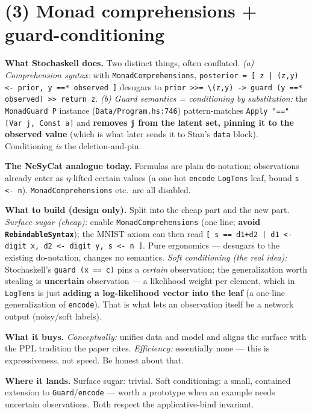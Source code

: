\documentclass[11pt]{article}
\newcommand{\code}[1]{\texttt{#1}}
\begin{document}
\section*{(3) Monad comprehensions + guard-conditioning}

\textbf{What Stochaskell does.} Two distinct things, often conflated. \emph{(a) Comprehension syntax:}
with \code{MonadComprehensions}, \code{posterior = [ z | (z,y) <- prior, y ==* observed ]} desugars to
\code{prior >>= \textbackslash(z,y) -> guard (y ==* observed) >> return z}. \emph{(b) Guard semantics =
conditioning by substitution:} the \code{MonadGuard P} instance (\code{Data/Program.hs:746}) pattern-matches
\code{Apply "==" [Var j, Const a]} and \textbf{removes \code{j} from the latent set, pinning it to the
observed value} (which is what later sends it to Stan's \code{data} block). Conditioning \emph{is} the
deletion-and-pin.

\textbf{The NeSyCat analogue today.} Formulas are plain \code{do}-notation; observations already enter as
$\eta$-lifted certain values (a one-hot \code{encode} \code{LogTens} leaf, bound \code{s <- n}).
\code{MonadComprehensions} etc.\ are all disabled.

\textbf{What to build (design only).} Split into the cheap part and the new part. \emph{Surface sugar
(cheap):} enable \code{MonadComprehensions} (one line; \textbf{avoid \code{RebindableSyntax}}); the MNIST
axiom can then read \code{[ s == d1+d2 | d1 <- digit x, d2 <- digit y, s <- n ]}. Pure ergonomics ---
desugars to the existing do-notation, changes no semantics. \emph{Soft conditioning (the real idea):}
Stochaskell's \code{guard (x == c)} pins a \emph{certain} observation; the generalization worth stealing
is \textbf{uncertain} observation --- a likelihood weight per element, which in \code{LogTens} is just
\textbf{adding a log-likelihood vector into the leaf} (a one-line generalization of \code{encode}). That
is what lets an observation itself be a network output (noisy/soft labels).

\textbf{What it buys.} \emph{Conceptually:} unifies data and model and aligns the surface with the PPL
tradition the paper cites. \emph{Efficiency:} essentially none --- this is expressiveness, not speed. Be
honest about that.

\textbf{Where it lands.} Surface sugar: trivial. Soft conditioning: a small, contained extension to
\code{Guard}/\code{encode} --- worth a prototype when an example needs uncertain observations. Both
respect the applicative-bind invariant.
\end{document}

